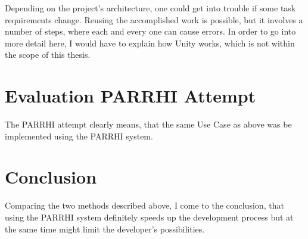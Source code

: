 Depending on the project's architecture, one could get into trouble if some task requirements change. Reusing the accomplished work is possible, but it involves a number of steps, where each and every one can cause errors. In order to go into more detail here, I would have to explain how Unity works, which is not within the scope of this thesis. 

\section{Evaluation PARRHI Attempt}
The PARRHI attempt clearly means, that the same Use Case as above was be implemented using the PARRHI system.

\section{Conclusion}
Comparing the two methods described above, I come to the conclusion, that using the PARRHI system definitely speeds up the development process but at the same time might limit the developer's possibilities. 


